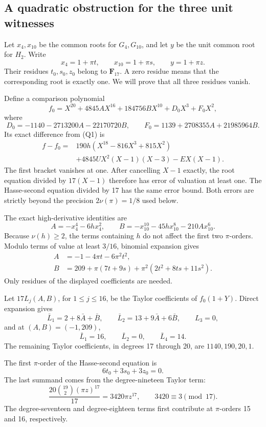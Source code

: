 \documentclass[
  british,
  10pt,
  a4paper,
]{article}
\begin{document}
\subsection{A quadratic obstruction for the three unit
witnesses}\label{a-quadratic-obstruction-for-the-three-unit-witnesses}

Let \(x_4,x_{10}\) be the common roots for \(G_4,G_{10}\), and let \(y\)
be the unit common root for \(H_2\). Write \[
x_4=1+\pi t,\qquad x_{10}=1+\pi s,\qquad y=1+\pi z.
\] Their residues \(t_0,s_0,z_0\) belong to \(\mathbf F_{17}\). A zero
residue means that the corresponding root is exactly one. We will prove
that all three residues vanish.

Define a comparison polynomial \[
f_0=X^{20}+4845AX^{16}+184756BX^{10}+D_0X^3+F_0X^2,
\] where \[
D_0=-1140-2713200A-22170720B,\qquad
F_0=1139+2708355A+21985964B.
\] Its exact difference from (Q1) is \[
\begin{aligned}
f-f_0={}&190h(X^{18}-816X^3+815X^2)\\
&+4845UX^2(X-1)(X-3)-EX(X-1).
\end{aligned} \tag{Q10}
\] The first bracket vanishes at one. After cancelling \(X-1\) exactly,
the root equation divided by \(17(X-1)\) therefore has error of
valuation at least one. The Hasse-second equation divided by 17 has the
same error bound. Both errors are strictly beyond the precision
\(2\nu(\pi)=1/8\) used below.

The exact high-derivative identities are \[
A=-x_4^4-6hx_4^2,\qquad
B=-x_{10}^{10}-45hx_{10}^8-210Ax_{10}^6.
\] Because \(\nu(h)\geq2\), the terms containing \(h\) do not affect the
first two \(\pi\)-orders. Modulo terms of value at least \(3/16\),
binomial expansion gives \[
\begin{aligned}
A&=-1-4\pi t-6\pi^2t^2,\\
B&=209+\pi(7t+9s)+\pi^2(2t^2+8ts+11s^2).
\end{aligned} \tag{Q11}
\] Only residues of the displayed coefficients are needed.

Let \(17L_j(A,B)\), for \(1\leq j\leq16\), be the Taylor coefficients of
\(f_0(1+Y)\). Direct expansion gives \[
\bar L_1=2+8\bar A+\bar B,\qquad
\bar L_2=13+9\bar A+6\bar B,\qquad L_3=0,
\] and at \((A,B)=(-1,209)\), \[
\bar L_1=16,\qquad \bar L_2=0,\qquad \bar L_4=14.
\] The remaining Taylor coefficients, in degrees 17 through 20, are
\(1140,190,20,1\).

The first \(\pi\)-order of the Hasse-second equation is \[
6t_0+3s_0+3z_0=0. \tag{Q12}
\] The last summand comes from the degree-nineteen Taylor term: \[
\frac{20\binom{19}{2}(\pi z)^{17}}{17}
   =3420\pi z^{17},\qquad 3420\equiv3\pmod {17}.
\] The degree-seventeen and degree-eighteen terms first contribute at
\(\pi\)-orders 15 and 16, respectively.
\end{document}
